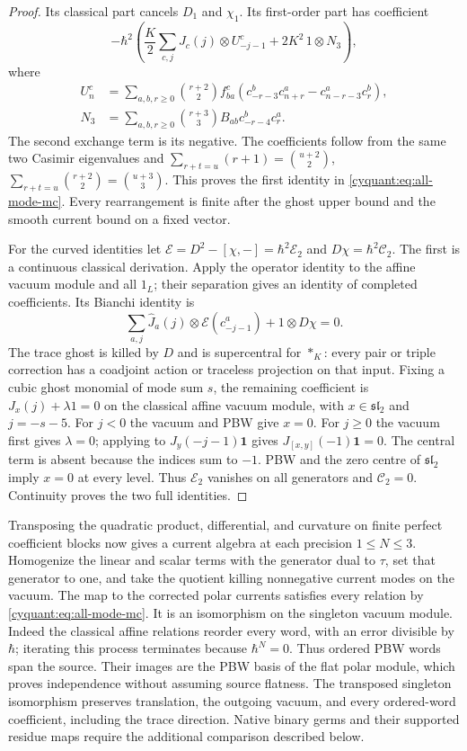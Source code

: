 \begin{proof}
Its classical part cancels $D_1$ and $\chi_1$.
Its first-order part has coefficient
\[
 -\hbar^2\left(\frac K2\sum_{c,j}J_c(j)\otimes U^c_{-j-1}
                       +2K^2\,1\otimes N_3\right),
\]
where
\[
 \begin{aligned}
 U_n^c&=\sum_{a,b,r\geq0}\binom{r+2}{2}f_{ba}^c
       (c_{-r-3}^bc_{n+r}^a-c_{n-r-3}^ac_r^b),\\
 N_3&=\sum_{a,b,r\geq0}\binom{r+3}{3}B_{ab}c_{-r-4}^bc_r^a.
 \end{aligned}
\]
The second exchange term is its negative.  The coefficients follow
from the same two Casimir eigenvalues and
$\sum_{r+t=u}(r+1)=\binom{u+2}{2}$,
$\sum_{r+t=u}\binom{r+2}{2}=\binom{u+3}{3}$.
This proves the first identity in \eqref{cyquant:eq:all-mode-mc}.
Every rearrangement is finite after the ghost upper bound and the
smooth current bound on a fixed vector.

For the curved identities let
$\mathcal E=D^2-[\chi,-]=\hbar^2\mathcal E_2$ and
$D\chi=\hbar^2\mathcal C_2$.  The first is a continuous classical
derivation.  Apply the operator identity to the affine vacuum module
and all $1_L$; their separation gives an identity of completed
coefficients.  Its Bianchi identity is
\[
 \sum_{a,j}\widehat J_a(j)\otimes\mathcal E(c^a_{-j-1})
                        +1\otimes D\chi=0.
\]
The trace ghost is killed by $D$ and is supercentral for $*_K$:
every pair or triple correction has a coadjoint action or traceless
projection on that input.  Fixing a cubic ghost monomial of mode sum
$s$, the remaining coefficient is $J_x(j)+\lambda1=0$ on the
classical affine vacuum module, with $x\in\mathfrak{sl}_2$ and
$j=-s-5$.  For $j<0$ the vacuum and PBW give $x=0$.
For $j\geq0$ the vacuum first gives $\lambda=0$; applying to
$J_y(-j-1)\mathbf1$ gives $J_{[x,y]}(-1)\mathbf1=0$.
The central term is absent because the indices sum to $-1$.
PBW and the zero centre of $\mathfrak{sl}_2$ imply $x=0$ at every
level.  Thus $\mathcal E_2$ vanishes on all generators and
$\mathcal C_2=0$.  Continuity proves the two full identities.
\end{proof}

Transposing the quadratic product, differential, and curvature on
finite perfect coefficient blocks now gives a current algebra at
each precision $1\leq N\leq3$.  Homogenize the linear and scalar
terms with the generator dual to $\tau$, set that generator to one,
and take the quotient killing nonnegative current modes on the vacuum.
The map to the corrected polar currents satisfies every relation by
\eqref{cyquant:eq:all-mode-mc}.  It is an isomorphism on the singleton
vacuum module.  Indeed the classical affine relations reorder every
word, with an error divisible by $\hbar$; iterating this process
terminates because $\hbar^N=0$.  Thus ordered PBW words span the
source.  Their images are the PBW basis of the flat polar module,
which proves independence without assuming source flatness.
The transposed singleton isomorphism preserves translation, the
outgoing vacuum, and every ordered-word coefficient, including the
trace direction.  Native binary germs and their supported residue
maps require the additional comparison described below.

